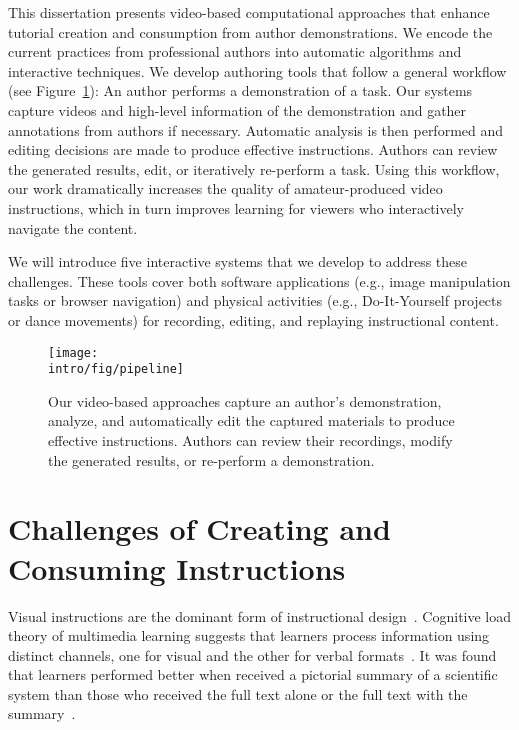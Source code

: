 This dissertation presents video-based computational approaches that enhance tutorial creation and consumption from author demonstrations.
We encode the current practices from professional authors into automatic algorithms and interactive techniques.
%
We develop authoring tools that follow a general workflow (see Figure~\ref{fig:general_pipeline}): An author performs a demonstration of a task. Our systems capture videos and high-level information of the demonstration and gather annotations from authors if necessary. Automatic analysis is then performed and editing decisions are made to produce effective instructions. Authors can review the generated results, edit, or iteratively re-perform a task.
%
Using this workflow, our work dramatically increases the quality of amateur-produced video instructions, which in turn improves learning for viewers who interactively navigate the content.

We will introduce five interactive systems that we develop to address these challenges. These tools cover both software applications (e.g., image manipulation tasks or browser navigation) and physical activities (e.g., Do-It-Yourself projects or dance movements) for recording, editing, and replaying instructional content.

\begin{figure}[t!]
  \centering
  \texttt{[image: \\intro/fig/pipeline]}
  \caption{Our video-based approaches capture an author's demonstration, analyze, and automatically edit the captured materials to produce effective instructions. Authors can review their recordings, modify the generated results, or re-perform a demonstration.}
  \label{fig:general_pipeline}
\end{figure}


\section{Challenges of Creating and Consuming Instructions}

Visual instructions are the dominant form of instructional design~\cite{mijksenaar1999open}. Cognitive load theory of multimedia learning suggests that learners process information using distinct channels, one for visual and the other for verbal formats~\cite{sweller1998cognitive,sweller1988cognitive,paas2003cognitive}. It was found that learners performed better when received a pictorial summary of a scientific system than those who received the full text alone or the full text with the summary~\cite{mayer1996less}.

